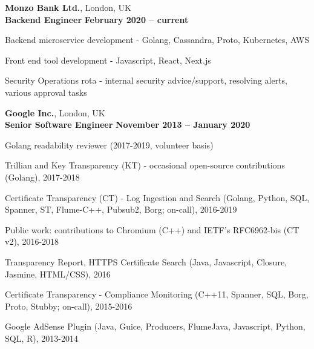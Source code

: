 \documentclass[line]{resume}
\begin{document}
\begin{resume}
    \textbf{Monzo Bank Ltd.}, London, UK \vspace{2mm}\\\vspace{1mm}%
    \textbf{Backend Engineer} \hfill \textbf{February 2020 -- current}\vspace{-3mm}\\\vspace{-1mm}%
    \begin{list2}
        \item Backend microservice development - Golang, Cassandra, Proto, Kubernetes, AWS
        \item Front end tool development - Javascript, React, Next.js
        \item Security Operations rota - internal security advice/support, resolving alerts, various approval tasks
    \end{list2}\vspace{-1.5mm}

    \textbf{Google Inc.}, London, UK \vspace{2mm}\\\vspace{1mm}%
    \textbf{Senior Software Engineer} \hfill \textbf{November 2013 -- January 2020}\vspace{-3mm}\\\vspace{-1mm}%
    \begin{list2}
        \item Golang readability reviewer (2017-2019, volunteer basis)
        \item Trillian and Key Transparency (KT) - occasional open-source contributions (Golang), 2017-2018
        \item Certificate Transparency (CT) - Log Ingestion and Search (Golang, Python, SQL, Spanner, ST, Flume-C++, Pubsub2, Borg; on-call), 2016-2019
        \item Public work: contributions to Chromium (C++) and IETF's RFC6962-bis (CT v2), 2016-2018
        \item Transparency Report, HTTPS Certificate Search (Java, Javascript, Closure, Jasmine, HTML/CSS), 2016
        \item Certificate Transparency - Compliance Monitoring (C++11, Spanner, SQL, Borg, Proto, Stubby; on-call), 2015-2016
        \item Google AdSense Plugin (Java, Guice, Producers, FlumeJava, Javascript, Python, SQL, R), 2013-2014
    \end{list2}\vspace{-1.5mm}


\end{resume}
\end{document}

